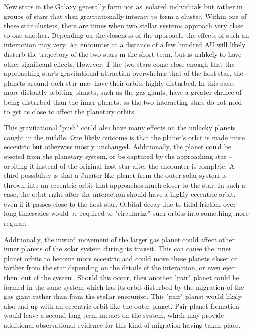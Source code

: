 \documentclass[12pt]{article}
\begin{document}
New stars in the Galaxy generally form not as isolated individuals but rather in groups of stars
that then gravitationally interact to form a cluster.
Within one of these star clusters, there are times when two stellar systems approach very close
to one another. Depending on the closeness of the approach, the effects of such
an interaction may very. An encounter at a distance of a few hundred AU will likely disturb the trajectory
of the two stars in the short term, but is unlikely to have other significant effects. However,
if the two stars come close enough that the approaching star's gravitational attraction
overwhelms that of the host star, the planets around each star may have their orbits
highly disturbed. In this case, more distantly orbiting planets, such as the gas giants,
have a greater chance of being disturbed than the inner planets, as the two 
interacting stars do not need to get as close to affect the planetary orbits.

This gravitational "push" could also have many effects on the unlucky planets caught in the
middle. One likely outcome is that the planet's orbit is made more eccentric but otherwise
mostly unchanged. Additionally, the planet could be ejected from the planetary system,
or be captured by the approaching star -- orbiting it instead of the original host star
after the encounter is complete. A third possibility is that a Jupiter-like planet
from the outer solar system is thrown into an eccentric 
orbit that approaches much closer to the
star. In such a case, the orbit right after the interaction should have a highly
eccentric orbit, even if it passes close to the host star. Orbital decay due to tidal
friction over long
timescales would be required to "circularize" such orbits into something more regular.

Additionally, the inward movement of the larger gas planet could affect other
inner planets of the solar system during its transit. This can
cause the inner planet orbits to become more eccentric and could move
these planets closer or farther from the star depending on the details of the
interaction, or even eject them out of the system. Should this occur,
then another "pair" planet could be formed in the same system which has its orbit
disturbed by the migration of the gas giant rather than from the stellar encounter. 
This "pair" planet 
would likely also end up with an eccentric orbit like the outer planet. Pair planet formation would leave
a second long-term impact on the system, which may provide additional observational
evidence for this kind of migration having taken place.
\end{document}
